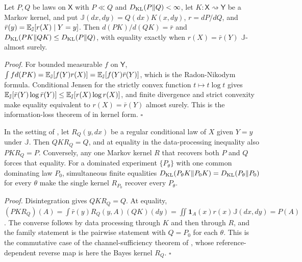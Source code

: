 \label{eq:cg-kl-dpi}
\label{eq:cg-kl-equality}
Let $P,Q$ be laws on $\mathsf X$ with $P\ll Q$ and $D_{\mathrm{KL}}(P\Vert Q)<\infty$, let
$K:\mathsf X\rightsquigarrow\mathsf Y$ be a Markov kernel, and put $\mathbb J(dx,dy)=Q(dx)K(x,dy)$,
$r=dP/dQ$, and $\bar r(y)=\mathbb E_{\mathbb J}[r(X)\mid Y=y]$. Then $d(PK)/d(QK)=\bar r$ and
$D_{\mathrm{KL}}(PK\Vert QK)\leq D_{\mathrm{KL}}(P\Vert Q)$, with equality exactly when $r(X)=\bar r(Y)$
$\mathbb J$-almost surely. 

\noindent\emph{Proof.}
For bounded measurable $f$ on $\mathsf Y$,
$\int f d(PK)=\mathbb E_{\mathbb J}[f(Y)r(X)]=\mathbb E_{\mathbb J}[f(Y)\bar r(Y)]$, which is the
Radon-Nikodym formula. Conditional Jensen for the strictly convex function $t\mapsto t\log t$
gives $\mathbb E_{\mathbb J}[\bar r(Y)\log\bar r(Y)]\leq\mathbb E_{\mathbb J}[r(X)\log r(X)]$, and finite divergence
and strict convexity make equality equivalent to $r(X)=\bar r(Y)$ almost surely. This is the
information-loss theorem of \citet{Kullback1951,Csiszar1967} in kernel form. $\square$

In the setting of , let $R_Q(y,dx)$ be a regular conditional law of $X$
given $Y=y$ under $\mathbb J$. Then $QKR_Q=Q$, and at equality in the data-processing inequality
also $PKR_Q=P$. Conversely, any one Markov kernel $R$ that recovers both $P$ and $Q$ forces that
equality. For a dominated experiment $\{P_\theta\}$ with one common dominating law $P_0$,
simultaneous finite equalities $D_{\mathrm{KL}}(P_\theta K\Vert P_0K)=D_{\mathrm{KL}}(P_\theta\Vert P_0)$ for every $\theta$
make the single kernel $R_{P_0}$ recover every $P_\theta$. 

\noindent\emph{Proof.}
Disintegration gives $QKR_Q=Q$. At equality,
$(PKR_Q)(A)=\int\bar r(y)R_Q(y,A)(QK)(dy)=\iint\mathbf 1_A(x)r(x)\mathbb J(dx,dy)=P(A)$. The converse
follows by data processing through $K$ and then through $R$, and the family statement is the pairwise
statement with $Q=P_0$ for each $\theta$. This is the commutative case of the channel-sufficiency
theorem of \citet{Petz1988}, whose reference-dependent reverse map is here the Bayes kernel $R_Q$.
$\square$

